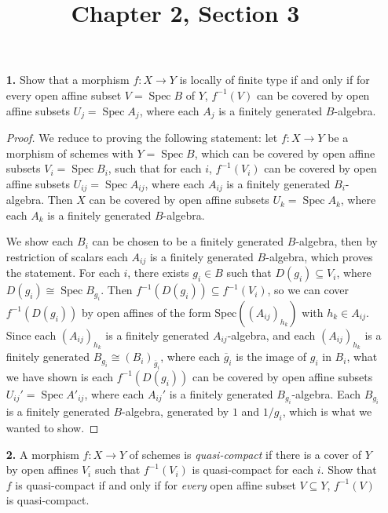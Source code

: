 \documentclass{article}
\title{Chapter 2, Section 3}
\DeclareMathOperator{\spec}{Spec}
\begin{document}
\maketitle
\begin{enumerate} [label=\textbf{\arabic*.}, leftmargin=0em]

\item[\textbf{1.}] Show that a morphism $f : X \to Y$ is locally of finite type if and only if for every open affine subset $V = \spec{B}$ of $Y$, $f^{-1}(V)$ can be covered by open affine subsets $U_j = \spec{A_j}$, where each $A_j$ is a finitely generated $B$-algebra.

\begin{proof}
    We reduce to proving the following statement: let $f : X \to Y$ be a morphism of schemes with $Y = \spec{B}$, which can be covered by open affine subsets $V_i = \spec{B_i}$, such that for each $i$, $f^{-1}(V_i)$ can be covered by open affine subsets $U_{ij} = \spec{A_{ij}}$, where each $A_{ij}$ is a finitely generated $B_i$-algebra. Then $X$ can be covered by open affine subsets $U_k = \spec{A_k}$, where each $A_k$ is a finitely generated $B$-algebra.
    
    We show each $B_i$ can be chosen to be a finitely generated $B$-algebra, then by restriction of scalars each $A_{ij}$ is a finitely generated $B$-algebra, which proves the statement. For each $i$, there exists $g_i \in B$ such that $D(g_i) \subseteq V_i$, where $D(g_i) \cong \spec{B_{g_i}}$. Then $f^{-1}(D(g_i)) \subseteq f^{-1}(V_i)$, so we can cover $f^{-1}(D(g_i))$ by open affines of the form $\text{Spec}((A_{ij})_{h_k})$ with $h_k \in A_{ij}$. Since each $(A_{ij})_{h_k}$ is a finitely generated $A_{ij}$-algebra, and each $(A_{ij})_{h_k}$ is a finitely generated $B_{g_i} \cong (B_i)_{\overline{g}_i}$, where each $\overline{g}_i$ is the image of $g_i$ in $B_i$, what we have shown is each $f^{-1}(D(g_i))$ can be covered by open affine subsets $U_{ij}' = \spec{A'_{ij}}$, where each $A_{ij}'$ is a finitely generated $B_{g_i}$-algebra. Each $B_{g_i}$ is a finitely generated $B$-algebra, generated by $1$ and $1 / g_i$, which is what we wanted to show.
\end{proof}

\item[\textbf{2.}] A morphism $f : X \to Y$ of schemes is \textit{quasi-compact} if there is a cover of $Y$ by open affines $V_i$ such that $f^{-1}(V_i)$ is quasi-compact for each $i$. Show that $f$ is quasi-compact if and only if for \textit{every} open affine subset $V \subseteq Y$, $f^{-1}(V)$ is quasi-compact.


\end{enumerate}
\end{document}
